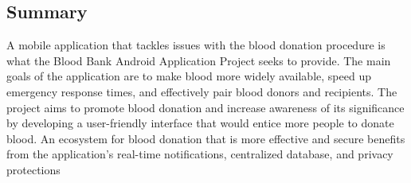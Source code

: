 \subsection{Summary}
A mobile application that tackles issues with the blood donation procedure is what the Blood
Bank Android Application Project seeks to provide. The main goals of the application are to make
blood more widely available, speed up emergency response times, and effectively pair blood
donors and recipients. The project aims to promote blood donation and increase awareness of
its significance by developing a user-friendly interface that would entice more people to donate
blood. An ecosystem for blood donation that is more effective and secure benefits from the
application's real-time notifications, centralized database, and privacy protections